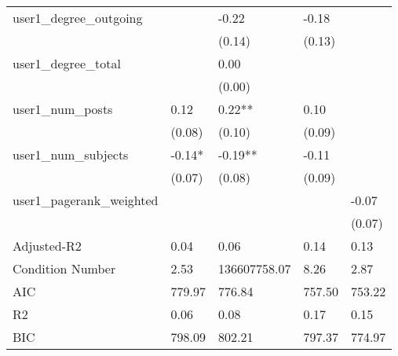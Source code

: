 \begin{table}
\begin{center}
\begin{tabular}{lllll}
user1_degree_outgoing                          &         & -0.22        & -0.18   &          \\
                                               &         & (0.14)       & (0.13)  &          \\
user1_degree_total                             &         & 0.00         &         &          \\
                                               &         & (0.00)       &         &          \\
user1_num_posts                                & 0.12    & 0.22**       & 0.10    &          \\
                                               & (0.08)  & (0.10)       & (0.09)  &          \\
user1_num_subjects                             & -0.14*  & -0.19**      & -0.11   &          \\
                                               & (0.07)  & (0.08)       & (0.09)  &          \\
user1_pagerank_weighted                        &         &              &         & -0.07    \\
                                               &         &              &         & (0.07)   \\
Adjusted-R2                                    & 0.04    & 0.06         & 0.14    & 0.13     \\
Condition Number                               & 2.53    & 136607758.07 & 8.26    & 2.87     \\
AIC                                            & 779.97  & 776.84       & 757.50  & 753.22   \\
R2                                             & 0.06    & 0.08         & 0.17    & 0.15     \\
BIC                                            & 798.09  & 802.21       & 797.37  & 774.97   \\
\hline
\end{tabular}
\end{center}
\end{table}